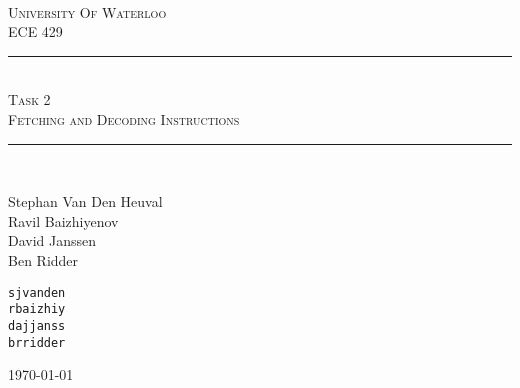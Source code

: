 \begin{titlepage}
\begin{center}
\vfill
\hfill
\\[2cm]
\textsc{\LARGE University Of Waterloo}
\\[1cm]
\textsc{\LARGE ECE 429}
\\[2cm]

\hrule
\hfill
\\[0.5cm]
\textsc{\huge Task 2}
\\[0.5cm]
\textsc{\huge Fetching and Decoding Instructions}
\\[0.5cm]
\hrule
\hfill
\\[1cm]

\begin{minipage}{0.4\textwidth}
\begin{flushleft} \large
Stephan Van Den Heuval \\
Ravil Baizhiyenov \\
David Janssen \\
Ben Ridder
\end{flushleft}
\end{minipage}
\begin{minipage}{0.4\textwidth}
\begin{flushright} \large
\texttt{sjvanden} \\
\texttt{rbaizhiy} \\
\texttt{dajjanss} \\
\texttt{brridder} 
\end{flushright}
\end{minipage}


\vfill

{\large \today}
\end{center}
\end{titlepage}
